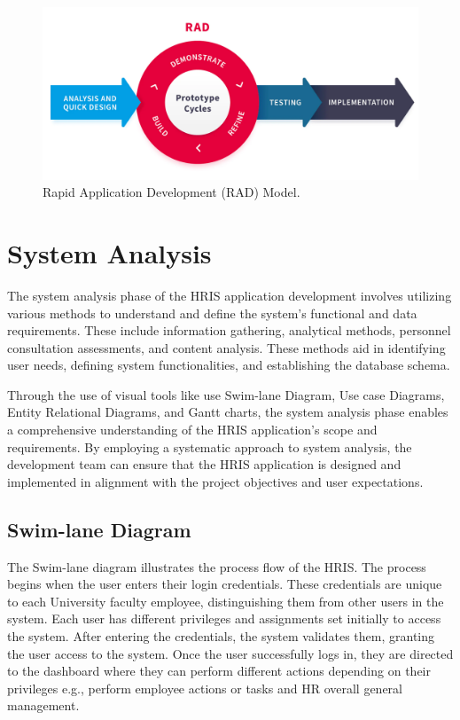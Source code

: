 \begin{figure}[H]
    \centering
    \includegraphics[width=1\linewidth]{figures/images/rad.png}
    \caption{Rapid Application Development (RAD) Model.}
    \label{fig:rad}
\end{figure}
    
\section{System Analysis}
The system analysis phase of the HRIS application development involves utilizing various methods to understand and define the system's functional and data requirements. These include information gathering, analytical methods, personnel consultation assessments, and content analysis. These methods aid in identifying user needs, defining system functionalities, and establishing the database schema. 

Through the use of visual tools like use Swim-lane Diagram, Use case Diagrams, Entity Relational Diagrams, and Gantt charts, the system analysis phase enables a comprehensive understanding of the HRIS application's scope and requirements. By employing a systematic approach to system analysis, the development team can ensure that the HRIS application is designed and implemented in alignment with the project objectives and user expectations.

    \subsection{Swim-lane Diagram}
    The Swim-lane diagram illustrates the process flow of the HRIS. The process begins when the user enters their login credentials. These credentials are unique to each University faculty employee, distinguishing them from other users in the system. Each user has different privileges and assignments set initially to access the system. After entering the credentials, the system validates them, granting the user access to the system. Once the user successfully logs in, they are directed to the dashboard where they can perform different actions depending on their privileges e.g., perform employee actions or tasks and HR overall general management.

